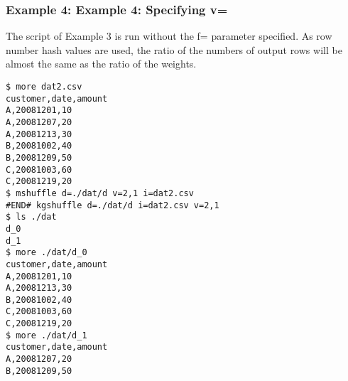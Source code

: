 \subsubsection*{Example 4: Example 4: Specifying v=}

The script of Example 3 is run without the f= parameter specified. As row number hash values are used, the ratio of the numbers of output rows will be almost the same as the ratio of the weights.


\begin{Verbatim}[baselinestretch=0.7,frame=single]
$ more dat2.csv
customer,date,amount
A,20081201,10
A,20081207,20
A,20081213,30
B,20081002,40
B,20081209,50
C,20081003,60
C,20081219,20
$ mshuffle d=./dat/d v=2,1 i=dat2.csv
#END# kgshuffle d=./dat/d i=dat2.csv v=2,1
$ ls ./dat
d_0
d_1
$ more ./dat/d_0
customer,date,amount
A,20081201,10
A,20081213,30
B,20081002,40
C,20081003,60
C,20081219,20
$ more ./dat/d_1
customer,date,amount
A,20081207,20
B,20081209,50
\end{Verbatim}
